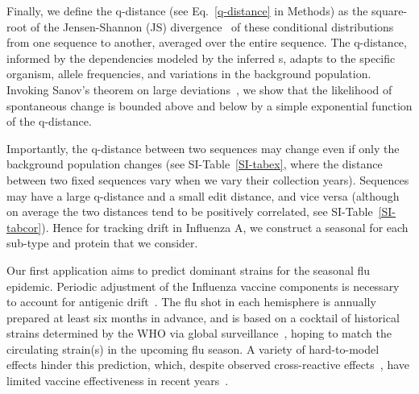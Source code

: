 \documentclass[onecolumn, compsoc,10pt]{IEEEtran}
\begin{document}
Finally, we define the q-distance (see Eq.~\eqref{q-distance} in Methods) as the square-root of the Jensen-Shannon (JS) divergence~\cite{cover} of these conditional distributions from one sequence to another, averaged over the entire sequence. The q-distance, informed by the dependencies modeled by the inferred {\qnet}s, adapts to the specific organism, allele frequencies, and variations in the background population. Invoking Sanov's theorem on large deviations~\cite{cover}, we show  that the  likelihood of spontaneous change is bounded above and below by a simple exponential function of the  q-distance. 


Importantly, the q-distance  between two sequences may change even if only the background population changes (see SI-Table~\ref{SI-tabex}, where  the distance between two  fixed sequences vary when we vary their collection years). Sequences may have a large q-distance and a small edit distance, and vice versa (although on average the two distances tend to be positively correlated, see SI-Table~\ref{SI-tabcor}).  Hence for tracking drift in Influenza A, we construct a seasonal \qnet for each sub-type and protein that we consider.

Our first application aims to predict dominant strains for the seasonal flu epidemic. Periodic adjustment of the Influenza vaccine components is necessary to account for antigenic drift~\cite{boni2008vaccination,dos2016influenza}. The flu shot in each hemisphere is annually prepared at least six months in advance, and is based on a cocktail of historical strains determined by the WHO via global surveillance~\cite{agor2018models}, hoping to match the circulating strain(s) in the upcoming flu season. A variety of hard-to-model effects hinder this prediction, which, despite observed cross-reactive effects~\cite{tricco2013comparing}, have limited vaccine effectiveness in recent years~\cite{cdceff}.
\end{document}
